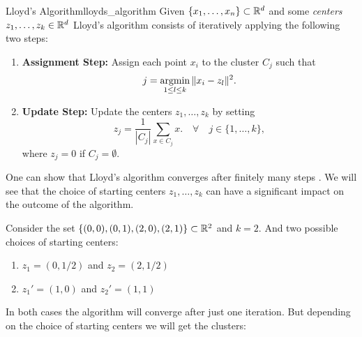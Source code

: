\begin{definition}{Lloyd's Algorithm}{lloyds_algorithm}
Given $\{x_1, \dots, x_n\} \subset \mathbb R^d$ and some \emph{centers} $z_1, \dots, z_k \in \mathbb R^d$
Lloyd's algorithm consists of iteratively applying the following two steps:

\begin{enumerate}
    \item \textbf{Assignment Step:} Assign each point $x_i$ to the cluster $C_j$ such that
    $$
    j = \operatorname*{argmin}_{1 \leq l \leq k} \|x_i - z_l\|^2.
    $$

    \item \textbf{Update Step:} Update the centers $z_1, \dots, z_k$ by setting
    $$
    z_j = \frac{1}{|C_j|}\sum_{x \in C_j} x. \quad \forall \quad j \in \{1, \dots, k\},
    $$
    where $z_j = 0$ if $C_j = \emptyset$. 
\end{enumerate}
\end{definition}

One can show that Lloyd's algorithm converges after finitely many steps \cite[Thm.~3.14]{Scitovski2021}.
We will see that the choice of starting centers $z_1, \dots, z_k$ can have a significant impact on the outcome of the algorithm.

Consider the set $\{(0,0), (0,1), (2,0), (2,1)\} \subset \mathbb R^2$ and $k = 2$. And two possible choices of starting centers:

\begin{enumerate}
    \item $z_1 = (0, 1/2)$ and $z_2 = (2, 1/2)$
    \item $z_1' = (1, 0)$ and $z_2' = (1, 1)$
\end{enumerate}

In both cases the algorithm will converge after just one iteration. But depending on the choice of starting centers we will get the clusters:


